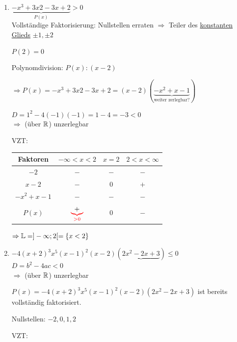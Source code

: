 \begin{enumerate}[A)]
\begin{enumerate}[1.]
		
		\clearpage
		\item $\underbrace{-x^3+3x2-3x+2}_{P(x)}>0$\\
		Vollständige Faktorisierung: Nullstellen erraten $\Rightarrow$ Teiler des \ul{konstanten Glieds} $\pm1,\pm2$
		
		$P(2)=0$
		
		Polynomdivision: $P(x):(x-2)$
		
		$\Rightarrow P(x) = -x^3+3x2-3x+2=(x-2)(\underbrace{-x^2+x-1}_\text{weiter zerlegbar?})$
		
		$D= 1^2 -4(-1)(-1)=1-4=-3 <0$\\
		$\Rightarrow$ (über $\mathbb{R}$) unzerlegbar
		
		VZT:\\
		\begin{tabular}{c|c|c|c}
			Faktoren & $-\infty<x<2$ & $x=2$ & $2<x<\infty$\\
			\hline
			$-2$ & $-$ & $-$ & $-$ \\
			$x - 2$ & $-$ & $0$ & $+$ \\
			$-x^2+x-1$ & $-$ & $-$ & $-$ \\
			\hline
			$P(x)$ & $\textcolor{red}{\underbrace{\textcolor{black}{+}}_{>0}}$ & $0$ & $-$ \\
		\end{tabular}
		
		$\Rightarrow \mathbb{L}=]-\infty;2[ = \{x<2\}$
		
		\clearpage
		\item $-4(x+2)^3x^5(x-1)^2(x-2)(\underbrace{2x^2-2x+3})\le0$\\
		$D=b^2-4ac < 0$\\
		$\Rightarrow$ (über $\mathbb{R}$) unzerlegbar
		
		$P(x) = -4(x+2)^3x^5(x-1)^2(x-2)(2x^2-2x+3)$ ist bereits vollständig faktorisiert.
		
		Nullstellen: $-2,0,1,2$
		
		VZT:
		

\end{enumerate}
\end{enumerate}
